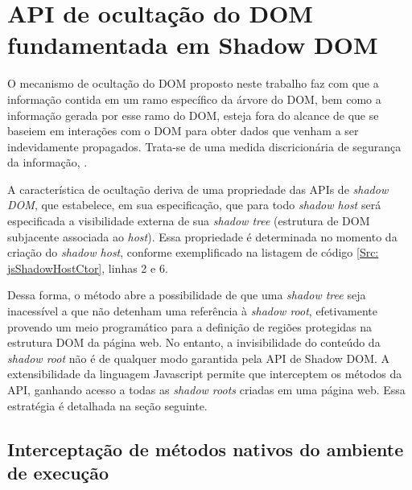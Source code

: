 
\section{API de ocultação do DOM fundamentada em Shadow DOM}
O mecanismo de ocultação do DOM proposto neste trabalho faz com que a informação contida em um ramo específico da árvore do DOM, bem como a informação gerada por esse ramo do DOM, esteja fora do alcance de \scripts{} que se baseiem em interações com o DOM para obter dados que venham a ser indevidamente propagados. Trata-se de uma medida discricionária de segurança da informação, .

A característica de ocultação deriva de uma propriedade das APIs de \textit{shadow DOM}, que estabelece, em sua especificação, que para todo \textit{shadow host} será especificada a visibilidade externa de sua \textit{shadow tree} (estrutura de DOM subjacente associada ao \textit{host}). Essa propriedade é determinada no momento da criação do \textit{shadow host}, conforme exemplificado na listagem de código \ref{Src: jsShadowHostCtor}, linhas 2 e 6.



Dessa forma, o método {} abre a possibilidade de que uma \textit{shadow tree} seja inacessível a \scripts{} que não detenham uma referência à \textit{shadow root}, efetivamente provendo um meio programático para a definição de regiões protegidas na estrutura DOM da página web. No entanto, a invisibilidade do conteúdo da \textit{shadow root} não é de qualquer modo garantida pela API de Shadow DOM. A extensibilidade da linguagem Javascript permite que \scripts{} interceptem os métodos da API, ganhando acesso a todas as \textit{shadow roots} criadas em uma página web. Essa estratégia é detalhada na seção seguinte. %

\subsection{Interceptação de métodos nativos do ambiente de execução}

